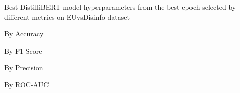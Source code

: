 \begin{table}[!htbp]
    \caption{Best DistilliBERT model hyperparameters from the best epoch selected by different metrics on EUvsDisinfo dataset}
    \label{tab:euvsdisinfo_distillibert_hparams}
    \centering

    \begin{subtable}[t]{0.48\linewidth}
        \scriptsize
        \caption{By Accuracy}
        
    \end{subtable}
    \hfill
    \begin{subtable}[t]{0.48\linewidth}
        \scriptsize
        \caption{By F1-Score}
        
    \end{subtable}

    \vspace{1em}

    \begin{subtable}[t]{0.48\linewidth}
        \scriptsize
        \caption{By Precision}
        
    \end{subtable}
    \hfill
    \begin{subtable}[t]{0.48\linewidth}
        \scriptsize
        \caption{By ROC-AUC}
        
    \end{subtable}


\end{table}